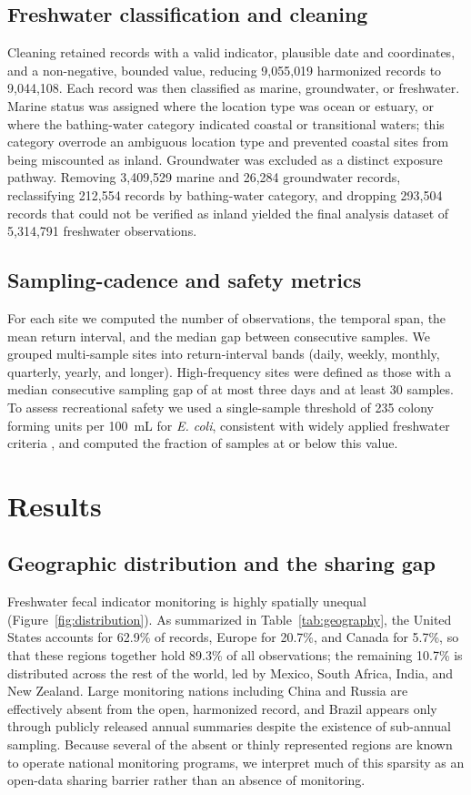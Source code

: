 \documentclass{agujournal2019}
\begin{document}
\subsection{Freshwater classification and cleaning}
Cleaning retained records with a valid indicator, plausible date and coordinates, and a non-negative, bounded value, reducing 9{,}055{,}019 harmonized records to 9{,}044{,}108. Each record was then classified as marine, groundwater, or freshwater. Marine status was assigned where the location type was ocean or estuary, or where the bathing-water category indicated coastal or transitional waters; this category overrode an ambiguous location type and prevented coastal sites from being miscounted as inland. Groundwater was excluded as a distinct exposure pathway. Removing 3{,}409{,}529 marine and 26{,}284 groundwater records, reclassifying 212{,}554 records by bathing-water category, and dropping 293{,}504 records that could not be verified as inland yielded the final analysis dataset of 5{,}314{,}791 freshwater observations.

\subsection{Sampling-cadence and safety metrics}
For each site we computed the number of observations, the temporal span, the mean return interval, and the median gap between consecutive samples. We grouped multi-sample sites into return-interval bands (daily, weekly, monthly, quarterly, yearly, and longer). High-frequency sites were defined as those with a median consecutive sampling gap of at most three days and at least 30 samples. To assess recreational safety we used a single-sample threshold of 235 colony forming units per 100~mL for \textit{E. coli}, consistent with widely applied freshwater criteria \cite{epa2012recreational,boehm2008sea}, and computed the fraction of samples at or below this value.

\section{Results}

\subsection{Geographic distribution and the sharing gap}
Freshwater fecal indicator monitoring is highly spatially unequal (Figure~\ref{fig:distribution}). As summarized in Table~\ref{tab:geography}, the United States accounts for 62.9\% of records, Europe for 20.7\%, and Canada for 5.7\%, so that these regions together hold 89.3\% of all observations; the remaining 10.7\% is distributed across the rest of the world, led by Mexico, South Africa, India, and New Zealand. Large monitoring nations including China and Russia are effectively absent from the open, harmonized record, and Brazil appears only through publicly released annual summaries despite the existence of sub-annual sampling. Because several of the absent or thinly represented regions are known to operate national monitoring programs, we interpret much of this sparsity as an open-data sharing barrier rather than an absence of monitoring.
\end{document}
